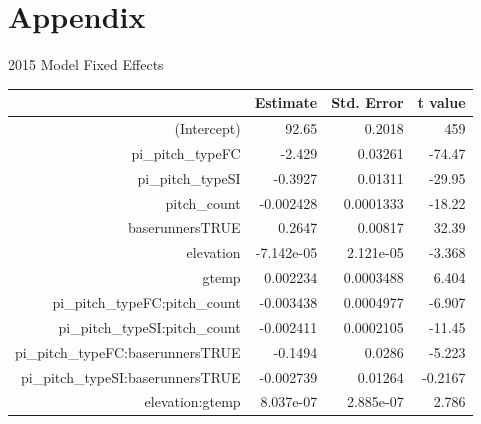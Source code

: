 \documentclass[letterpaper,12pt]{article}\usepackage[]{graphicx}\usepackage[]{color}
\begin{document}
\section*{Appendix}
2015 Model Fixed Effects
\begin{table}[ht]
\centering
\begin{tabular}{rrrr}
  \hline
 & Estimate & Std. Error & t value \\ 
  \hline
(Intercept) & 92.65 & 0.2018 &   459 \\ 
  pi\_pitch\_typeFC & -2.429 & 0.03261 & -74.47 \\ 
  pi\_pitch\_typeSI & -0.3927 & 0.01311 & -29.95 \\ 
  pitch\_count & -0.002428 & 0.0001333 & -18.22 \\ 
  baserunnersTRUE & 0.2647 & 0.00817 & 32.39 \\ 
  elevation & -7.142e-05 & 2.121e-05 & -3.368 \\ 
  gtemp & 0.002234 & 0.0003488 & 6.404 \\ 
  pi\_pitch\_typeFC:pitch\_count & -0.003438 & 0.0004977 & -6.907 \\ 
  pi\_pitch\_typeSI:pitch\_count & -0.002411 & 0.0002105 & -11.45 \\ 
  pi\_pitch\_typeFC:baserunnersTRUE & -0.1494 & 0.0286 & -5.223 \\ 
  pi\_pitch\_typeSI:baserunnersTRUE & -0.002739 & 0.01264 & -0.2167 \\ 
  elevation:gtemp & 8.037e-07 & 2.885e-07 & 2.786 \\ 
   \hline
\end{tabular}
\end{table}
\end{document}
